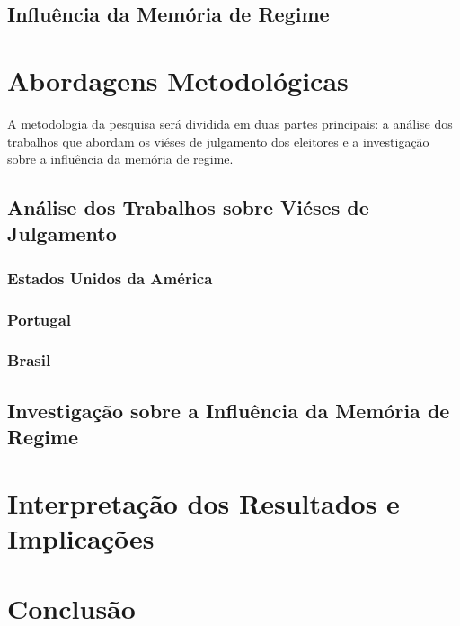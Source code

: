 \subsection{Influência da Memória de Regime}

\section{Abordagens Metodológicas}
A metodologia da pesquisa será dividida em duas partes principais: a análise dos trabalhos que abordam os viéses de julgamento dos eleitores e a investigação sobre a influência da memória de regime.

\subsection{Análise dos Trabalhos sobre Viéses de Julgamento}

\subsubsection{Estados Unidos da América}

\subsubsection{Portugal}

\subsubsection{Brasil}

\subsection{Investigação sobre a Influência da Memória de Regime}


\section{Interpretação dos Resultados e Implicações}

\section{Conclusão}

